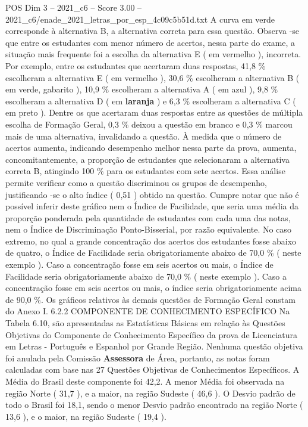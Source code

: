 \begin{textsample}{POS Dim 3 – 2021\_c6 – Score 3.00 – 2021\_c6/enade\_2021\_letras\_por\_esp\_4c09c5b51d.txt}
A curva em verde corresponde à alternativa B, a alternativa correta para essa questão.
Observa -se que entre os estudantes com menor número de acertos, nessa parte do exame, a situação mais frequente foi a escolha da alternativa E ( em vermelho ), incorreta.
Por exemplo, entre os estudantes que acertaram duas respostas, 41,8 \% escolheram a alternativa E ( em vermelho ), 30,6 \% escolheram a alternativa B ( em verde, gabarito ), 10,9 \% escolheram a alternativa A ( em azul ), 9,8 \% escolheram a alternativa D ( em \textbf{laranja} ) e 6,3 \% escolheram a alternativa C ( em preto ).
Dentre os que acertaram duas respostas entre as questões de múltipla escolha de Formação Geral, 0,3 \% deixou a questão em branco e 0,3 \% marcou mais de uma alternativa, invalidando a questão.
À medida que o número de acertos aumenta, indicando desempenho melhor nessa parte da prova, aumenta, concomitantemente, a proporção de estudantes que selecionaram a alternativa correta B, atingindo 100 \% para os estudantes com sete acertos.
Essa análise permite verificar como a questão discriminou os grupos de desempenho, justificando -se o alto índice ( 0,51 ) obtido na questão.
Cumpre notar que não é possível inferir deste gráfico nem o Índice de Facilidade, que seria uma média da proporção ponderada pela quantidade de estudantes com cada uma das notas, nem o Índice de Discriminação Ponto-Bisserial, por razão equivalente.
No caso extremo, no qual a grande concentração dos acertos dos estudantes fosse abaixo de quatro, o Índice de Facilidade seria obrigatoriamente abaixo de 70,0 \% ( neste exemplo ).
Caso a concentração fosse em seis acertos ou mais, o Índice de Facilidade seria obrigatoriamente abaixo de 70,0 \% ( neste exemplo ).
Caso a concentração fosse em seis acertos ou mais, o índice seria obrigatoriamente acima de 90,0 \%.
Os gráficos relativos às demais questões de Formação Geral constam do Anexo I. 6.2.2 COMPONENTE DE CONHECIMENTO ESPECÍFICO Na Tabela 6.10, são apresentadas as Estatísticas Básicas em relação às Questões Objetivas do Componente de Conhecimento Específico da prova de Licenciatura em Letras - Português e Espanhol por Grande Região.
Nenhuma questão objetiva foi anulada pela Comissão \textbf{Assessora} de Área, portanto, as notas foram calculadas com base nas 27 Questões Objetivas de Conhecimentos Específicos.
A Média do Brasil deste componente foi 42,2.
A menor Média foi observada na região Norte ( 31,7 ), e a maior, na região Sudeste ( 46,6 ).
O Desvio padrão de todo o Brasil foi 18,1, sendo o menor Desvio padrão encontrado na região Norte ( 13,6 ), e o maior, na região Sudeste ( 19,4 ).

\end{textsample}
